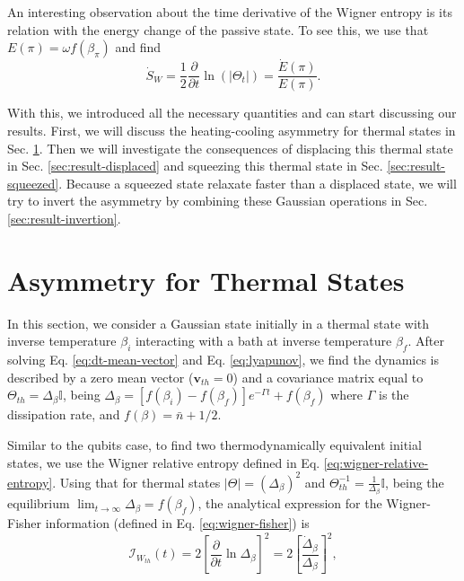 \noindent An interesting observation about the time derivative of the Wigner entropy is its relation with the energy change of the passive state. To see this, we use that $E(\pi) = \omega f(\beta_\pi)$ and find
\begin{equation}
    \dot{S}_W = \frac{1}{2} \frac{\partial}{\partial t} \ln (|\Theta_t|) = \frac{\dot{E}(\pi)}{E(\pi)}.
\end{equation}

With this, we introduced all the necessary quantities and can start discussing our results. First, we will discuss the heating-cooling asymmetry for thermal states in Sec. \ref{sec:result-thermal}. Then we will investigate the consequences of displacing this thermal state in Sec. \ref{sec:result-displaced} and squeezing this thermal state in Sec. \ref{sec:result-squeezed}. Because a squeezed state relaxate faster than a displaced state, we will try to invert the asymmetry by combining these Gaussian operations in Sec. \ref{sec:result-invertion}.

\section{Asymmetry for Thermal States}\label{sec:result-thermal}

In this section, we consider a Gaussian state initially in a thermal state with inverse temperature $\beta_i$ interacting with a bath at inverse temperature $\beta_f$. After solving Eq. \eqref{eq:dt-mean-vector} and Eq. \eqref{eq:lyapunov}, we find the dynamics is described by a zero mean vector ($\mathbf{v}_{th} = 0$) and a covariance matrix equal to $\Theta_{th} = \Delta_\beta \mathbb{I}$, being $\Delta_{\beta} = [f(\beta_i) - f(\beta_f)]e^{-\Gamma t} + f(\beta_f)$ where $\Gamma$ is the dissipation rate, and $f(\beta) = \bar{n} + 1/2$.

Similar to the qubits case, to find two thermodynamically equivalent initial states, we use the Wigner relative entropy defined in Eq. \eqref{eq:wigner-relative-entropy}. Using that for thermal states $|\Theta| = (\Delta_\beta)^2$ and $\Theta^{-1}_{th} = \frac{1}{\Delta_\beta} \mathbb{I}$, being the equilibrium $\lim_{t\rightarrow\infty} \Delta_\beta = f(\beta_f)$, the analytical expression for the Wigner-Fisher information (defined in Eq. \eqref{eq:wigner-fisher}) is
\begin{equation}
    \mathcal{I}_{W_{th}} (t) = 2 \left[ \frac{\partial}{\partial t} \ln \Delta_\beta \right]^2 = 2 \left[ \frac{\dot{\Delta}_\beta}{\Delta_\beta} \right]^2,
    \label{eq:wigner-fisher-thermal}
\end{equation}

